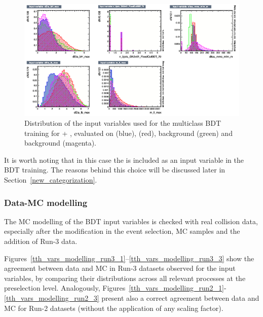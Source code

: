  \begin{figure}[htbp]
    \centering
    \includegraphics[width=0.95\linewidth]{images/plots_tH_tHqb_for_thesis/variables_id_c5.png}
    \caption{Distribution of the input variables used for the multiclass BDT training for \thtt + \ttHtt, evaluated on \ttHtt (blue), \thtt (red), \ztautau background (green) and \ttbar background (magenta).}
    \label{th_tth_vars_tmva_3}
\end{figure}

It is worth noting that in this case the \mmc is included as an input variable in the BDT training. The reasons behind this choice will be discussed later in Section~\ref{new_categorization}.
\FloatBarrier
\subsubsection*{Data-MC modelling}

The MC modelling of the BDT input variables is checked with real collision data, especially after the modification in the event selection, MC samples and the addition of Run-3 data.

Figures~\ref{tth_vars_modelling_run3_1}–\ref{tth_vars_modelling_run3_3} show the agreement between data and MC in Run-3 datasets observed for the input variables, by comparing their distributions across all relevant processes at the preselection level. Analogously, Figures~\ref{tth_vars_modelling_run2_1}-\ref{tth_vars_modelling_run2_3} present also a correct agreement between data and MC for Run-2 datasets (without the application of any scaling factor).

